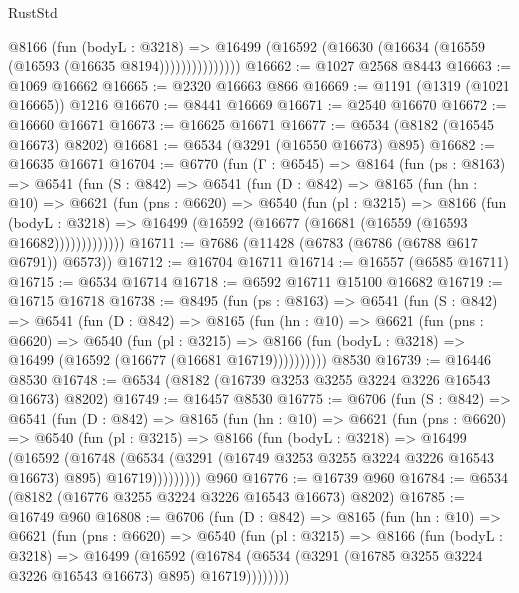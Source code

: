 \begin{lexlean}{RustStd}
\begin{coremodule}
                  @8166
                    (fun (bodyL : @3218) =>
                    @16499 (@16592 (@16630 (@16634 (@16559 (@16593 (@16635 @8194)))))))))))))))
@16662 := @1027 @2568 @8443
@16663 := @1069 @16662
@16665 := @2320 @16663 @866
@16669 := @1191 (@1319 (@1021 @16665)) @1216
@16670 := @8441 @16669
@16671 := @2540 @16670
@16672 := @16660 @16671
@16673 := @16625 @16671
@16677 := @6534 (@8182 (@16545 @16673) @8202)
@16681 := @6534 (@3291 (@16550 @16673) @895)
@16682 := @16635 @16671
@16704 := @6770
    (fun (Γ : @6545) =>
    @8164
      (fun (ps : @8163) =>
      @6541
        (fun (S : @842) =>
        @6541
          (fun (D : @842) =>
          @8165
            (fun (hn : @10) =>
            @6621
              (fun (pns : @6620) =>
              @6540
                (fun (pl : @3215) =>
                @8166
                  (fun (bodyL : @3218) =>
                  @16499 (@16592 (@16677 (@16681 (@16559 (@16593 @16682)))))))))))))
@16711 := @7686 (@11428 (@6783 (@6786 (@6788 @617 @6791)) @6573))
@16712 := @16704 @16711
@16714 := @16557 (@6585 @16711)
@16715 := @6534 @16714
@16718 := @6592 @16711 @15100 @16682
@16719 := @16715 @16718
@16738 := @8495
    (fun (ps : @8163) =>
    @6541
      (fun (S : @842) =>
      @6541
        (fun (D : @842) =>
        @8165
          (fun (hn : @10) =>
          @6621
            (fun (pns : @6620) =>
            @6540
              (fun (pl : @3215) =>
              @8166 (fun (bodyL : @3218) => @16499 (@16592 (@16677 (@16681 @16719))))))))))
    @8530
@16739 := @16446 @8530
@16748 := @6534 (@8182 (@16739 @3253 @3255 @3224 @3226 @16543 @16673) @8202)
@16749 := @16457 @8530
@16775 := @6706
    (fun (S : @842) =>
    @6541
      (fun (D : @842) =>
      @8165
        (fun (hn : @10) =>
        @6621
          (fun (pns : @6620) =>
          @6540
            (fun (pl : @3215) =>
            @8166
              (fun (bodyL : @3218) =>
              @16499
                (@16592
                  (@16748
                    (@6534
                      (@3291 (@16749 @3253 @3255 @3224 @3226 @16543 @16673) @895)
                      @16719)))))))))
    @960
@16776 := @16739 @960
@16784 := @6534 (@8182 (@16776 @3255 @3224 @3226 @16543 @16673) @8202)
@16785 := @16749 @960
@16808 := @6706
    (fun (D : @842) =>
    @8165
      (fun (hn : @10) =>
      @6621
        (fun (pns : @6620) =>
        @6540
          (fun (pl : @3215) =>
          @8166
            (fun (bodyL : @3218) =>
            @16499
              (@16592
                (@16784 (@6534 (@3291 (@16785 @3255 @3224 @3226 @16543 @16673) @895) @16719))))))))

\end{coremodule}
\end{lexlean}
